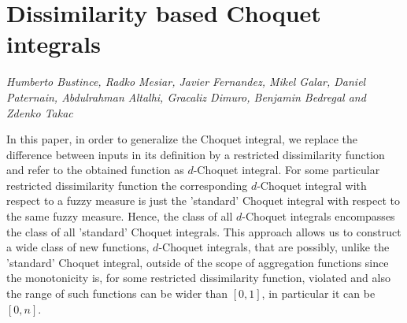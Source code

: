 \documentclass[../booklet.tex]{subfiles}
\begin{document}
\section[Dissimilarity based Choquet integrals. {\it Humberto Bustince, Radko Mesiar, Javier Fernandez, Mikel Galar, Daniel Paternain, Abdulrahman Altalhi, Gracaliz Dimuro, Benjamin Bedregal and Zdenko Takac}]{Dissimilarity based Choquet integrals}
        

\begin{center}
  {\it Humberto Bustince, Radko Mesiar, Javier Fernandez, Mikel Galar, Daniel Paternain, Abdulrahman Altalhi, Gracaliz Dimuro, Benjamin Bedregal and Zdenko Takac}
\end{center}

\vskip 0.8cm


In this paper, in order to generalize the Choquet integral, we replace the difference between inputs in its definition by a restricted dissimilarity function and refer to the obtained function as $d$-Choquet integral. For some particular restricted dissimilarity function the corresponding $d$-Choquet integral with respect to a fuzzy measure is just the 'standard' Choquet integral with respect to the same fuzzy measure. Hence, the class of all $d$-Choquet integrals encompasses the class of all 'standard' Choquet integrals. This approach allows us to construct a wide class of new functions, $d$-Choquet integrals, that are possibly, unlike the 'standard' Choquet integral, outside of the scope of aggregation functions since the monotonicity is, for some restricted dissimilarity function, violated and also the range of such functions can be wider than $[0,1]$, in particular it can be $[0,n]$.

\end{document}
